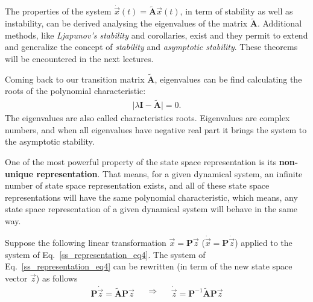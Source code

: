 \documentclass[12pt,a4paper,oneside]{book}
\begin{document}
\begin{onehalfspace}
The properties of the system $\dot{\vec{x}}(t)=\tilde{\mathbf{A}}\vec{x}(t)$, 
in term of stability as well as instability, can be derived analysing the 
eigenvalues of the matrix $\tilde{\mathbf{A}}$. Additional methods, like 
\textit{Ljapunov's stability} and corollaries, exist and they permit to extend 
and generalize the concept of \textit{stability} and \textit{asymptotic 
stability}. These theorems will be encountered in the next lectures.

Coming back to our transition matrix $\tilde{\mathbf{A}}$, eigenvalues can be find calculating the roots of the polynomial characteristic:
\begin{equation}\label{ss_representation_eq5}
	\begin{aligned}
		\Big|\lambda\mathbf{I}-\tilde{\mathbf{A}}\Big|=0.
	\end{aligned}
\end{equation}
The eigenvalues are also called characteristics roots. Eigenvalues are complex 
numbers, and when all eigenvalues have negative real part it brings the system 
to the asymptotic stability. 

One of the most powerful property of the state space representation is its 
\textbf{non-unique representation}. That means, for a given dynamical system, 
an infinite number of state space representation exists, and all of these state 
space representations will have the same polynomial characteristic, which 
means, any state space representation of a given dynamical system will behave 
in the same way. 

Suppose the following linear transformation $\vec{x}=\mathbf{P}\vec{z}$ 
($\dot{\vec{x}}=\mathbf{P}\dot{\vec{z}}$) applied to the system of 
Eq.~\eqref{ss_representation_eq4}. The system of 
Eq.~\eqref{ss_representation_eq4} can be rewritten (in term of the new state 
space vector $\vec{z}$) as follows
\begin{equation}\label{ss_representation_eq6}
	\begin{aligned}
		\mathbf{P}\dot{\vec{z}}=\tilde{\mathbf{A}}\mathbf{P}\vec{z}
	\end{aligned}\quad\Rightarrow\quad
	\begin{aligned}
	\dot{\vec{z}}=\mathbf{P}^{-1}\tilde{\mathbf{A}}\mathbf{P}\vec{z}
	\end{aligned}
\end{equation}


\end{onehalfspace}
\end{document}
